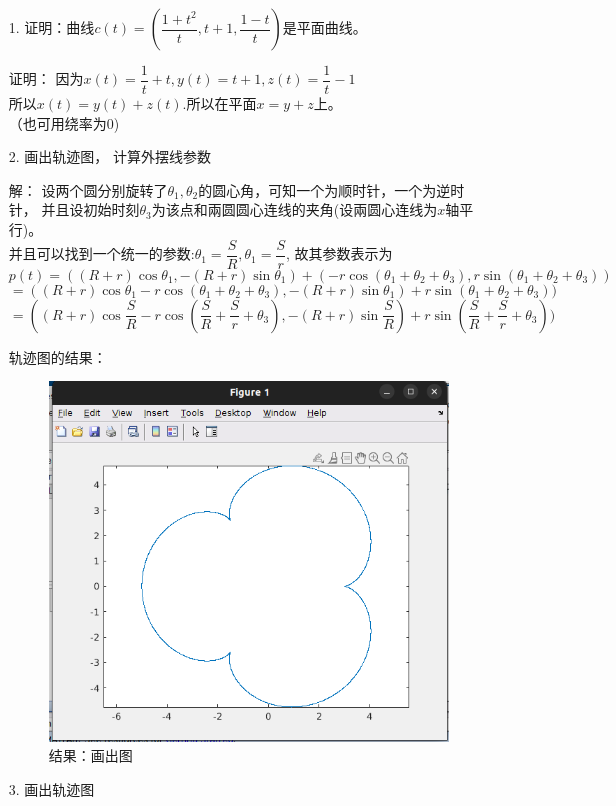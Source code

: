 \documentclass{article}
\begin{document}
	\begin{abstract}
		本次作业用\LaTeX 写。
	\end{abstract}
\begin{itemize}
	\item[1.] 证明：曲线$c(t) = \left(\dfrac{1 + t^2}{t} , t+1, \dfrac{1-t}{t}\right)$是平面曲线。
	
	证明： 因为$x(t) = \dfrac{1}{t} + t, y(t) = t+1, z(t) = \dfrac{1}{t}-1$ \\
	所以$x(t) = y(t) + z(t).$所以在平面$x = y + z$上。\\
	（也可用绕率为0)
	\item[2.] 画出轨迹图， 计算外摆线参数
	
	
	解： 设两个圆分别旋转了$\theta_1, \theta_2$的圆心角，可知一个为顺时针，一个为逆时针， 并且设初始时刻$\theta_3$为该点和兩圆圆心连线的夹角(设兩圆心连线为$x$轴平行)。\\
	并且可以找到一个统一的参数:$\theta_1 = \dfrac{S}{R}, \theta_1 = \dfrac{S}{r}$, 故其参数表示为
	\[ p(t) = ((R+r)\cos \theta_1, -(R+r) \sin \theta_1) + (-r\cos(\theta_1+\theta_2+\theta_3), r\sin (\theta_1+\theta_2+\theta_3))\]
	\[ = ((R+r)\cos \theta_1 - r\cos(\theta_1+\theta_2+\theta_3), -(R+r) \sin \theta_1) + r\sin (\theta_1+\theta_2+\theta_3) ) \]
	\[ =  ((R+r)\cos \dfrac{S}{R} - r\cos(\dfrac{S}{R}+\dfrac{S}{r}+\theta_3), -(R+r) \sin \dfrac{S}{R}) + r\sin (\dfrac{S}{R}+\dfrac{S}{r}+\theta_3) )\]
	
	轨迹图的结果：
	\begin{figure}[hpbt]
		\centering
		\includegraphics[width=0.5\linewidth]{./res1.png}
		\caption{结果：画出图}
	\end{figure}
	\item[3.] 画出轨迹图
	

\end{itemize}
\end{document}
